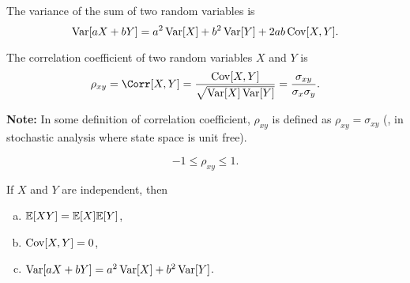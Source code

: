 \begin{theorem}
    The variance of the sum of two random variables is
    \[\mathop{\mathrm{Var}}\nolimits[aX+bY]=a^2\mathop{\mathrm{Var}}\nolimits[X]+b^2\mathop{\mathrm{Var}}\nolimits[Y]+2ab\mathop{\mathrm{Cov}}\nolimits[X,Y].\]
\end{theorem}

\begin{definition}
    The correlation coefficient of two random variables $X$ and $Y$ is
    \[\rho_{xy}=\Corr[X,Y]=\frac{\Cov[X,Y]}{\sqrt{\Var[X]\Var[Y]}}=\frac{\sigma_{xy}}{\sigma_x\sigma_y}.\]
\end{definition}
\textbf{Note:} In some definition of correlation coefficient, $\rho_{xy}$ is defined as $\rho_{xy}=\sigma_{xy}$ (\eg , in stochastic analysis where state space is unit free).

\begin{theorem}
    \[-1\leq \rho_{xy}\leq 1.\]
\end{theorem}

\begin{theorem}
    If $X$ and $Y$ are independent, then
    \begin{enumerate}[(a)]
        \item $\E{XY}=\E{X}\E{Y}$,
        \item $\mathop{\mathrm{Cov}}\nolimits[X, Y]=0$,
        \item $\mathop{\mathrm{Var}}\nolimits[aX+bY]=a^2\mathop{\mathrm{Var}}\nolimits[X]+b^2\mathop{\mathrm{Var}}\nolimits[Y]$.
    \end{enumerate}
\end{theorem}



